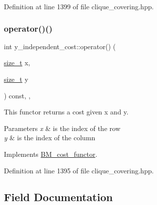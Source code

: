Definition at line 1399 of file clique\+\_\+covering.\+hpp.

\mbox{\label{structy__independent__cost_a887fe6ac33c423e279ef34c2205ac5ad}} 
\subsubsection{\texorpdfstring{operator()()}{operator()()}}
{\footnotesize\ttfamily int y\+\_\+independent\+\_\+cost\+::operator() (\begin{DoxyParamCaption}\item[{\hyperlink{tutorial__fpt__2017_2intro_2sixth_2test_8c_a7c94ea6f8948649f8d181ae55911eeaf}{size\+\_\+t}}]{x,  }\item[{\hyperlink{tutorial__fpt__2017_2intro_2sixth_2test_8c_a7c94ea6f8948649f8d181ae55911eeaf}{size\+\_\+t}}]{y }\end{DoxyParamCaption}) const\hspace{0.3cm}{\ttfamily [inline]}, {\ttfamily [override]}, {\ttfamily [virtual]}}



This functor returns a cost given x and y. 


\begin{DoxyParams}{Parameters}
{\em x} & is the index of the row \\
\hline
{\em y} & is the index of the column \\
\hline
\end{DoxyParams}


Implements \hyperlink{structBM__cost__functor_aa138a13f4daa2aee5b9e5b6315411bb1}{B\+M\+\_\+cost\+\_\+functor}.



Definition at line 1395 of file clique\+\_\+covering.\+hpp.



\subsection{Field Documentation}
\mbox{\label{structy__independent__cost_ac236094780354c67d4f5ef1674c7ae03}} 
